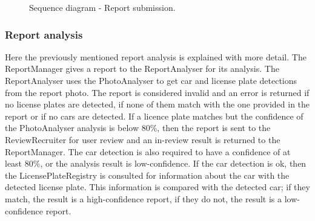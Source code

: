 \begin{figure}[H]
    \centering
    \caption{\label{fig:sequence-report-submission}Sequence diagram - Report submission.}
\end{figure}

\subsubsection{Report analysis}
Here the previously mentioned report analysis is explained with more detail.
The ReportManager gives a report to the ReportAnalyser for its analysis.
The ReportAnalyser uses the PhotoAnalyser to get car and license plate detections from the report photo. The report is considered invalid and an error is returned if no license plates are detected, if none of them match with the one provided in the report or if no cars are detected. If a licence plate matches but the confidence of the PhotoAnalyser analysis is below 80\%, then the report is sent to the ReviewRecruiter for user review and an in-review result is returned to the ReportManager.
The car detection is also required to have a confidence of at least 80\%, or the analysis result is low-confidence. If the car detection is ok, then the LicensePlateRegistry is consulted for information about the car with the detected license plate. This information is compared with the detected car; if they match, the result is a high-confidence report, if they do not, the result is a low-confidence report.

